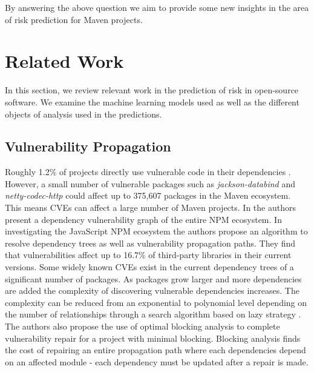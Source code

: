 \documentclass[conference]{IEEEtran}
\begin{document}
By answering the above question we aim to provide some new insights in the area of risk prediction for Maven projects. 

\section{Related Work}
In this section, we review relevant work in the prediction of risk in open-source software. We examine the machine learning models used as well as the different objects of analysis used in the predictions.  

\subsection{Vulnerability Propagation}
Roughly 1.2\% of projects directly use vulnerable code in their dependencies \cite{a_m_mir_effect_2023}. However, a small number of vulnerable packages such as \textit{jackson-databind} and \textit{netty-codec-http} could affect up to 375,607 packages in the Maven ecosystem. This means CVEs can affect a large number of Maven projects. In \cite{c_liu_demystifying_2022} the authors present a dependency vulnerability graph of the entire NPM ecosystem. In investigating the JavaScript NPM ecosystem the authors propose an algorithm to resolve dependency trees as well as vulnerability propagation paths. They find that vulnerabilities affect up to 16.7\% of third-party libraries in their current versions. Some widely known CVEs exist in the current dependency trees of a significant number of packages. As packages grow larger and more dependencies are added the complexity of discovering vulnerable dependencies increases. The complexity can be reduced from an exponential to polynomial level depending on the number of relationships through a search algorithm based on lazy strategy \cite{w_hu_open_2019}. The authors also propose the use of optimal blocking analysis to complete vulnerability repair for a project with minimal blocking. Blocking analysis finds the cost of repairing an entire propagation path where each dependencies depend on an affected module - each dependency must be updated after a repair is made. 
\end{document}
